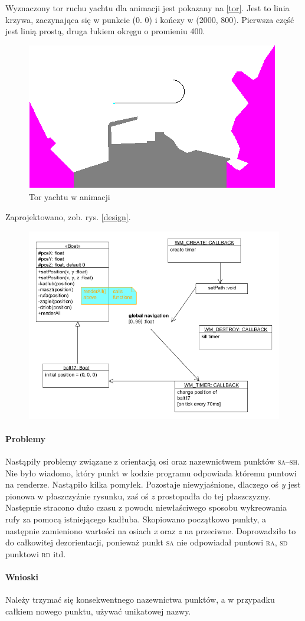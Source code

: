 Wyznaczony tor ruchu yachtu dla animacji jest pokazany na \autoref{tor}. Jest to linia krzywa, zaczynająca się w punkcie (0. 0) i kończy w (2000, 800). Pierwsza część jest linią prostą, druga łukiem okręgu o promieniu 400.
\begin{figure}[b]
	\includegraphics{img/swimmingLine}
	\caption{Tor yachtu w animacji}
	\label{tor}
\end{figure}

Zaprojektowano, zob. rys. \autoref{design}.
\begin{figure}
	\includegraphics[scale=0.75]{img/yacht}
	\label{design}
\end{figure}

\paragraph{Problemy}
Nastąpiły problemy związane z orientacją osi oraz nazewnictwem punktów \textsc{sa}--\textsc{sh}. Nie było wiadomo, który punkt w kodzie programu odpowiada któremu puntowi na renderze. Nastąpiło kilka pomyłek. Pozostaje niewyjaśnione, dlaczego oś \textit{y} jest pionowa w płaszczyźnie rysunku, zaś oś \textit{z} prostopadła do tej płaszczyzny. 
Następnie stracono dużo czasu z powodu niewłaściwego sposobu wykreowania rufy za pomocą istniejącego kadłuba. Skopiowano początkowo punkty, a następnie zamieniono wartości na osiach \textit{x} oraz \textit{z} na przeciwne. Doprowadziło to do całkowitej dezorientacji, ponieważ punkt \textsc{sa} nie odpowiadał puntowi \textsc{ra}, \textsc{sd} punktowi \textsc{rd} itd.

\paragraph{Wnioski}
Należy trzymać się konsekwentnego nazewnictwa punktów, a w przypadku całkiem nowego punktu, używać unikatowej nazwy.